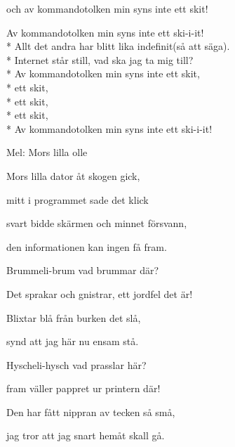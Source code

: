 \begin{SongText}[Kommandotolken]
\begin{Verse}
        och av kommandotolken min syns inte ett skit!
    \end{Verse}
    \begin{Verse}
        Av kommandotolken min syns inte ett ski-i-it!\\*%
        Allt det andra har blitt lika indefinit(så att säga).\\*%
        Internet står still, vad ska jag ta mig till?\\*%
        Av kommandotolken min syns inte ett skit,\\*%
        ett skit,\\*%
        ett skit,\\*%
        ett skit,\\*%
        Av kommandotolken min syns inte ett ski-i-it!
    \end{Verse}
\end{SongText}

\begin{SongText}
    \begin{SongInfo}
        Mel: Mors lilla olle
    \end{SongInfo}
    \begin{Verse}
        Mors lilla dator åt skogen gick,

        mitt i programmet sade det klick

        svart bidde skärmen och minnet försvann,

        den informationen kan ingen få fram.
    \end{Verse}
    \begin{Verse}
        Brummeli-brum vad brummar där?

        Det sprakar och gnistrar, ett jordfel det är!

        Blixtar blå från burken det slå,

        synd att jag här nu ensam stå.
    \end{Verse}
    \begin{Verse}
        Hyscheli-hysch vad prasslar här?

        fram väller pappret ur printern där!

        Den har fått nippran av tecken så små,

        jag tror att jag snart hemåt skall gå.
    \end{Verse}
\end{SongText}
\newpage